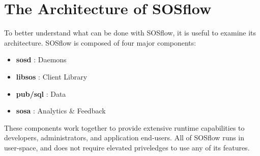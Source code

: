\section{The Architecture of SOSflow}
%
To better understand what can be done with SOSflow, it is useful to examine
its architecture.
%
SOSflow is composed of four major components:
\begin{itemize}
\item \textbf{sosd} : Daemons
\item \textbf{libsos} : Client Library
\item \textbf{pub/sql} : Data
\item \textbf{sosa} : Analytics \& Feedback 
\end{itemize}
%
These components work together to provide extensive runtime capabilities to
developers, administrators, and application end-users.
%
All of SOSflow runs in user-space, and does not require elevated priveledges
to use any of its features.
%
%
